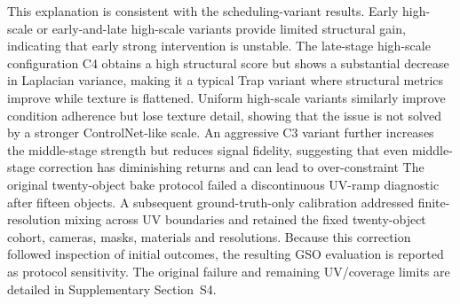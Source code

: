 \documentclass[times,twocolumn,final]{elsarticle}
\providecommand{\DIFadd}[1]{{\protect\color{blue} \sf #1}} %
\providecommand{\DIFdel}[1]{{\protect\color{red} \scriptsize #1}} %
\providecommand{\DIFaddbegin}{} %
\providecommand{\DIFaddend}{} %
\providecommand{\DIFdelbegin}{} %
\providecommand{\DIFdelend}{} %
\begin{document}
\DIFdelbegin \DIFdel{This explanation is consistent with the scheduling-variant results. Early high-scale or early-and-late high-scale variants provide limited structural gain, indicating that early strong intervention is unstable. The late-stage high-scale configuration C4 obtains a high structural score but shows a substantial decrease in Laplacian variance, making it a typical Trap variant where structural metrics improve while texture is flattened.
Uniform high-scale variants similarly improve condition adherence but lose texture detail, showing that the issue is not solved by a stronger ControlNet-like scale. An aggressive C3 variant further increases the middle-stage strength but reduces signal fidelity, suggesting that even middle-stage correction has diminishing returns and can lead to over-constraint}\DIFdelend \DIFaddbegin \DIFadd{The original twenty-object bake protocol failed a discontinuous UV-ramp diagnostic after fifteen objects. A subsequent ground-truth-only calibration addressed finite-resolution mixing across UV boundaries and retained the fixed twenty-object cohort, cameras, masks, materials and resolutions. Because this correction followed inspection of initial outcomes, the resulting GSO evaluation is reported as protocol sensitivity. The original failure and remaining UV/coverage limits are detailed in Supplementary Section~S4}\DIFaddend .

\DIFdelbegin %
\end{document}
